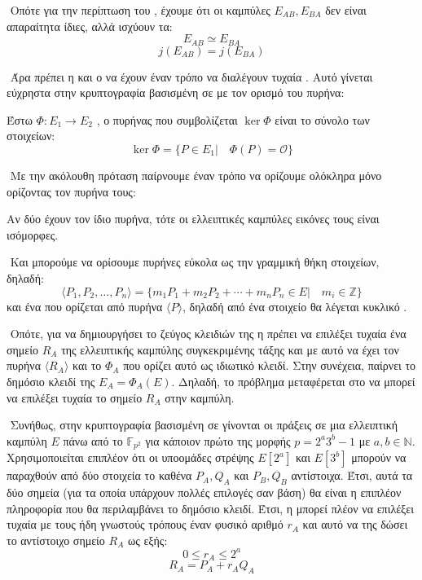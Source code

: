 \documentclass[oneside,a4paper]{article}
\begin{document}
$ $\newline
Οπότε για την περίπτωση του , έχουμε ότι οι καμπύλες $E_{AB}, E_{BA}$ δεν είναι απαραίτητα ίδιες, αλλά ισχύουν τα:
$$E_{AB} \simeq E_{BA}$$
$$j(E_{AB}) = j(E_{BA})$$

$ $\newline
Άρα πρέπει η  και ο  να έχουν έναν τρόπο να διαλέγουν τυχαία . Αυτό γίνεται εύχρηστα στην κρυπτογραφία βασισμένη σε  με τον ορισμό του πυρήνα:

\vspace*{0.1cm}
\begin{defn}
	Έστω $\Phi : E_1 \longrightarrow E_2$ , ο πυρήνας που συμβολίζεται $\ker \Phi$ είναι το σύνολο των στοιχείων:
	$$\ker \Phi = \{P \in E_1 | \quad \Phi(P) = \mathcal{O}\}$$
\end{defn}

$ $\newline
Με την ακόλουθη πρόταση παίρνουμε έναν τρόπο να ορίζουμε ολόκληρα  μόνο ορίζοντας τον πυρήνα τους:
\vspace*{0.1cm}
\begin{prop}
	Αν δύο  έχουν τον ίδιο πυρήνα, τότε οι ελλειπτικές καμπύλες εικόνες τους είναι ισόμορφες.
\end{prop}

$ $\newline
Και μπορούμε να ορίσουμε πυρήνες εύκολα ως την γραμμική θήκη στοιχείων, δηλαδή:
$$\langle P_1,P_2,\ldots,P_n \rangle = \{m_1 P_1 + m_2 P_2 +\cdots + m_n P_n \in E| \quad m_i \in \mathbb{Z}\}$$ και ένα  που ορίζεται από πυρήνα $\langle P \rangle$, δηλαδή από ένα στοιχείο θα λέγεται κυκλικό . 

$ $\newline
Οπότε, για να δημιουργήσει το ζεύγος κλειδιών της η  πρέπει να επιλέξει τυχαία ένα σημείο $R_A$ της ελλειπτικής καμπύλης συγκεκριμένης τάξης και με αυτό να έχει τον πυρήνα $\langle R_A \rangle$ και το  $\Phi_A$ που ορίζει αυτό ως ιδιωτικό κλειδί. Στην συνέχεια, παίρνει το δημόσιο κλειδί της $E_A = \Phi_A(E)$. Δηλαδή, το πρόβλημα μεταφέρεται στο να μπορεί να επιλέξει τυχαία το σημείο $R_A$ στην καμπύλη.

$ $\newline
Συνήθως, στην κρυπτογραφία βασισμένη σε  γίνονται οι πράξεις σε μια ελλειπτική καμπύλη $E$ πάνω από το $\mathbb{F}_{p^2}$ για κάποιον πρώτο της μορφής $p=2^a 3^b -1$ με $a,b \in \mathbb{N}$. Χρησιμοποιείται επιπλέον ότι οι υποομάδες στρέψης $E[2^a]$ και $E[3^b]$ μπορούν να παραχθούν από δύο στοιχεία το καθένα $P_A,Q_A$ και $P_B,Q_B$ αντίστοιχα. Έτσι, αυτά τα δύο σημεία (για τα οποία υπάρχουν πολλές επιλογές σαν βάση) θα είναι η επιπλέον πληροφορία που θα περιλαμβάνει το δημόσιο κλειδί. Έτσι, η  μπορεί πλέον να επιλέξει τυχαία με τους ήδη γνωστούς τρόπους έναν φυσικό αριθμό $r_A$ και αυτό να της δώσει το αντίστοιχο σημείο $R_A$ ως εξής:
$$0\leq r_A \leq 2^a$$
$$R_A = P_A + r_A Q_A$$
\end{document}
